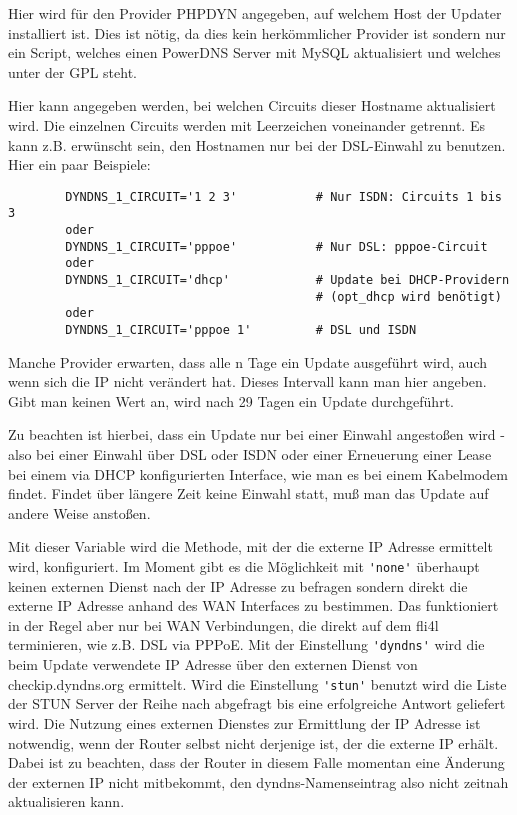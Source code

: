 \begin{description}
	{Hier wird für den Provider PHPDYN angegeben, auf welchem Host der
	Updater installiert ist. Dies ist nötig, da dies kein herkömmlicher
	Provider ist sondern nur ein Script, welches einen PowerDNS Server
	mit MySQL aktualisiert und welches unter der GPL steht.
	}


	{Hier kann angegeben werden, bei welchen Circuits dieser Hostname
	aktualisiert wird. Die einzelnen Circuits werden mit Leerzeichen
	voneinander getrennt. Es kann z.B. erwünscht sein, den Hostnamen nur bei
	der DSL-Einwahl zu benutzen. Hier ein paar Beispiele:

\begin{example}
\begin{verbatim}
        DYNDNS_1_CIRCUIT='1 2 3'           # Nur ISDN: Circuits 1 bis 3
        oder
        DYNDNS_1_CIRCUIT='pppoe'           # Nur DSL: pppoe-Circuit
        oder
        DYNDNS_1_CIRCUIT='dhcp'            # Update bei DHCP-Providern
                                           # (opt_dhcp wird benötigt)
        oder
        DYNDNS_1_CIRCUIT='pppoe 1'         # DSL und ISDN
\end{verbatim}
\end{example}
	}
Manche Provider erwarten, dass alle n Tage ein Update ausgeführt wird,
auch wenn sich die IP nicht verändert hat. Dieses Intervall kann man
hier angeben. Gibt man keinen Wert an, wird nach 29 Tagen ein Update
durchgeführt.

Zu beachten ist hierbei, dass ein Update nur bei einer Einwahl
angestoßen wird - also bei einer Einwahl über DSL oder ISDN oder einer
Erneuerung einer Lease bei einem via DHCP konfigurierten Interface,
wie man es bei einem Kabelmodem findet. Findet über längere Zeit keine
Einwahl statt, muß man das Update auf andere Weise anstoßen.


Mit dieser Variable wird die Methode, mit der die externe IP Adresse
ermittelt wird, konfiguriert. Im Moment gibt es die Möglichkeit mit
\verb*?'none'? überhaupt keinen externen Dienst nach der IP Adresse zu 
befragen sondern direkt die externe IP Adresse anhand des WAN Interfaces
zu bestimmen. Das funktioniert in der Regel aber nur bei WAN Verbindungen,
die direkt auf dem fli4l terminieren, wie z.B. DSL via PPPoE. Mit der
Einstellung \verb*?'dyndns'? wird die beim Update verwendete IP Adresse
über den externen Dienst von checkip.dyndns.org ermittelt. Wird die
Einstellung \verb*?'stun'? benutzt wird die Liste der STUN Server der
Reihe nach abgefragt bis eine erfolgreiche Antwort geliefert wird. Die
Nutzung eines externen Dienstes zur Ermittlung der IP Adresse ist notwendig,
wenn der  Router selbst nicht derjenige ist, der die externe IP erhält.
Dabei ist zu beachten, dass der Router in diesem Falle momentan eine Änderung
der externen IP nicht mitbekommt, den dyndns-Namenseintrag also nicht zeitnah
aktualisieren kann.


\end{description}
